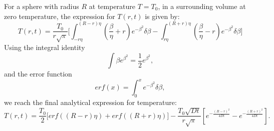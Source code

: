 For a sphere with radius $R$ at temperature $T=T_0$, in a surrounding volume at zero temperature, the expression for $T(r,t)$ is given by:
\begin{equation}
T(r,t) = \frac{T_0}{r\sqrt{\pi}} \bigg[ \int^{(R-r)\eta}_{-r \eta}  \left( \frac{\beta}{\eta} + r\right)e^{-\beta^2}\delta \beta - \int^{(R+r)\eta}_{r \eta}  \left( \frac{\beta}{\eta} - r\right) e^{-\beta^2} \delta \beta \bigg]
\end{equation}
Using the integral identity
\begin{equation}
\int \beta e^{\beta^2} = \frac{1}{2}e^{\beta^2}, 
\end{equation}
and the error function
\begin{equation}
{erf}(x) = \int_0^x e^{-\beta^2} \delta \beta, 
\end{equation}
we reach the final analytical expression for temperature:
\begin{equation}
T(r,t) = \frac{T_0}{2} \bigg[{erf}\left((R-r)\eta\right) + {erf}((R+r)\eta) \bigg] - \frac{T_0\sqrt{Dt}}{r\sqrt{\pi}}\left[ e^{-\frac{(R-r)^2}{4Dt}} - e^{-\frac{(R+r)^2}{4Dt}} \right].
\end{equation}
